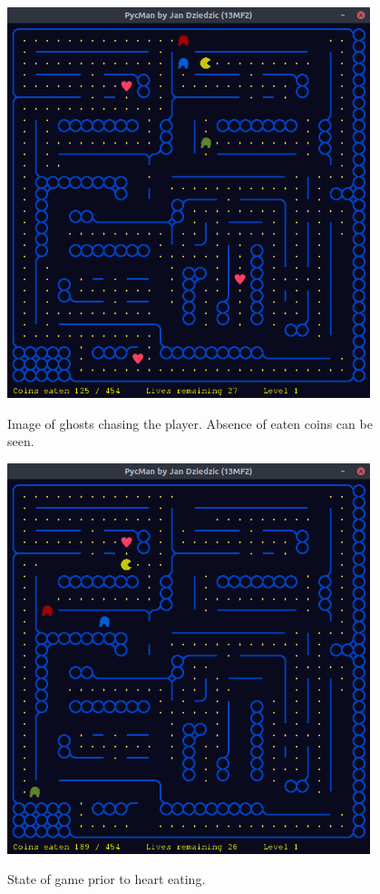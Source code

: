 \documentclass[11pt,a4paper,notitlepage]{report}
\newenvironment{img}{
	\begin{center}
		\begin{figure}[H]
			\begin{center}
			
}{
	\end{center}
		\end{figure}
			\end{center}
}
\begin{document}
			\begin{img}
				\includegraphics[width=300pt]{images/ghosts-chasing0.png}\\
				\caption{Image of ghosts chasing the player. Absence of eaten coins can be seen.}
			\end{img}
			\begin{img}
				\includegraphics[width=300pt]{images/hearts-working0.png}\\
				\caption{State of game prior to heart eating.}
			\end{img}
\end{document}
